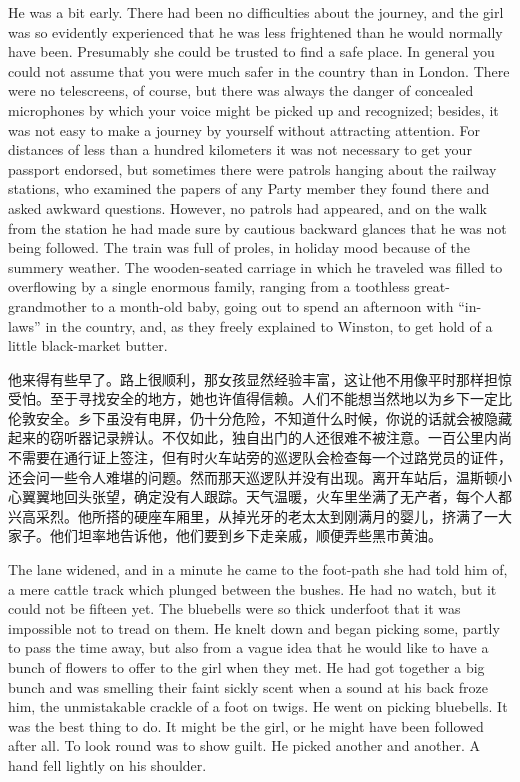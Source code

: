 \begin{paracol}{2}
\switchcolumn*

He was a bit early. There had been no difficulties about the journey,
and the girl was so evidently experienced that he was less frightened
than he would normally have been. Presumably she could be trusted to
find a safe place. In general you could not assume that you were much
safer in the country than in London. There were no telescreens, of
course, but there was always the danger of concealed microphones by
which your voice might be picked up and recognized; besides, it was not
easy to make a journey by yourself without attracting attention. For
distances of less than a hundred kilometers it was not necessary to get
your passport endorsed, but sometimes there were patrols hanging about
the railway stations, who examined the papers of any Party member they
found there and asked awkward questions. However, no patrols had
appeared, and on the walk from the station he had made sure by cautious
backward glances that he was not being followed. The train was full of
proles, in holiday mood because of the summery weather. The
wooden-seated carriage in which he traveled was filled to overflowing by
a single enormous family, ranging from a toothless great-grandmother to
a month-old baby, going out to spend an afternoon with ``in-laws'' in the
country, and, as they freely explained to Winston, to get hold of a
little black-market butter.

\switchcolumn

他来得有些早了。路上很顺利，那女孩显然经验丰富，这让他不用像平时那样担惊受怕。至于寻找安全的地方，她也许值得信赖。人们不能想当然地以为乡下一定比伦敦安全。乡下虽没有电屏，仍十分危险，不知道什么时候，你说的话就会被隐藏起来的窃听器记录辨认。不仅如此，独自出门的人还很难不被注意。一百公里内尚不需要在通行证上签注，但有时火车站旁的巡逻队会检查每一个过路党员的证件，还会问一些令人难堪的问题。然而那天巡逻队并没有出现。离开车站后，温斯顿小心翼翼地回头张望，确定没有人跟踪。天气温暖，火车里坐满了无产者，每个人都兴高采烈。他所搭的硬座车厢里，从掉光牙的老太太到刚满月的婴儿，挤满了一大家子。他们坦率地告诉他，他们要到乡下走亲戚，顺便弄些黑市黄油。

\switchcolumn*

The lane widened, and in a minute he came to the foot-path she had told
him of, a mere cattle track which plunged between the bushes. He had no
watch, but it could not be fifteen yet. The bluebells were so thick
underfoot that it was impossible not to tread on them. He knelt down and
began picking some, partly to pass the time away, but also from a vague
idea that he would like to have a bunch of flowers to offer to the girl
when they met. He had got together a big bunch and was smelling their
faint sickly scent when a sound at his back froze him, the unmistakable
crackle of a foot on twigs. He went on picking bluebells. It was the
best thing to do. It might be the girl, or he might have been followed
after all. To look round was to show guilt. He picked another and
another. A hand fell lightly on his shoulder.


\end{paracol}
